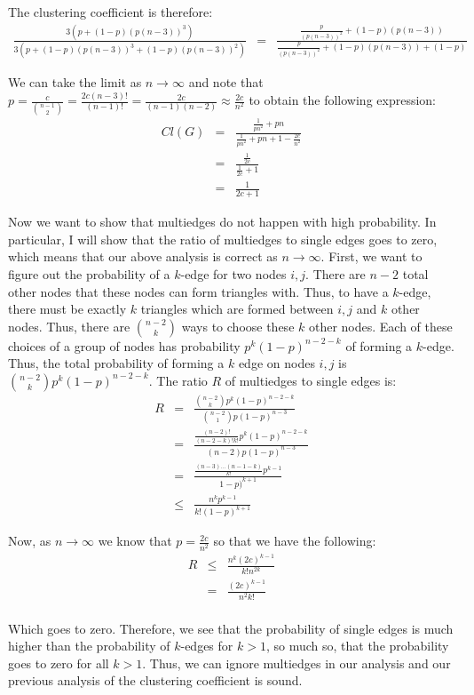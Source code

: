 \documentclass[psamsfonts]{amsart}
\newenvironment{sol}{{\bfseries Solution:}}{\qedsymbol}
\begin{document}
\begin{sol}
  The clustering coefficient is therefore:
  \begin{eqnarray}
    \frac{3(p + (1-p)(p(n-3))^3)}{3(p + (1-p)(p(n-3))^3 + (1-p)(p(n-3))^2)} &=& \frac{\frac{p}{(p(n-3))^2} + (1-p)(p(n-3))}{\frac{p}{(p(n-3))^2} + (1-p)(p(n-3)) + (1-p)}
  \end{eqnarray}

  We can take the limit as $n \to \infty$ and note that $p = \frac{c}{{n-1 \choose 2}} = \frac{2c(n-3)!}{(n-1)!} = \frac{2c}{(n-1)(n-2)} \approx \frac{2c}{n^2}$ to obtain the following expression:
  \begin{eqnarray}
    Cl(G) &=& \frac{\frac{1}{p n^2} + pn}{\frac{1}{pn^2} + pn + 1 - \frac{2c}{n^2}} \\
          &=& \frac{\frac{1}{2c}}{\frac{1}{2c} + 1} \\
          &=& \frac{1}{2c+1}
  \end{eqnarray}

  Now we want to show that multiedges do not happen with high probability. In particular, I will show that the ratio of multiedges to single edges goes to zero, which means that our above analysis is correct as $n \to \infty$. First, we want to figure out the probability of a $k$-edge for two nodes $i,j$. There are $n-2$ total other nodes that these nodes can form triangles with. Thus, to have a $k$-edge, there must be exactly $k$ triangles which are formed between $i,j$ and $k$ other nodes. Thus, there are ${n-2 \choose k}$ ways to choose these $k$ other nodes. Each of these choices of a group of nodes has probability $p^k (1-p)^{n-2-k}$ of forming a $k$-edge. Thus, the total probability of forming a $k$ edge on nodes $i,j$ is ${n-2 \choose k} p^k (1-p)^{n-2-k}$. The ratio $R$ of multiedges to single edges is:
  \begin{eqnarray}
    R &=& \frac{{n-2 \choose k} p^k (1-p)^{n-2-k}}{{n-2 \choose 1} p (1-p)^{n-3}} \\
      &=& \frac{\frac{(n-2)!}{(n-2-k)!k!} p^k(1-p)^{n-2-k}}{(n-2) p (1-p)^{n-3}} \\
      &=& \frac{\frac{(n-3)\ldots(n-1-k)}{k!} p^{k-1}}{1-p)^{k+1}}\\
      &\leq& \frac{n^k p^{k-1}}{k! (1-p)^{k+1}}
  \end{eqnarray}

  Now, as $n \to \infty$ we know that $p = \frac{2c}{n^2}$ so that we have the following:
  \begin{eqnarray}
    R &\leq& \frac{n^k (2c)^{k-1}}{k! n^{2k}} \\
      &=& \frac{(2c)^{k-1}}{n^2 k!} \\
  \end{eqnarray}

  Which goes to zero. Therefore, we see that the probability of single edges is much higher than the probability of $k$-edges for $k > 1$, so much so, that the probability goes to zero for all $k > 1$. Thus, we can ignore multiedges in our analysis and our previous analysis of the clustering coefficient is sound.
\end{sol}
\end{document}
